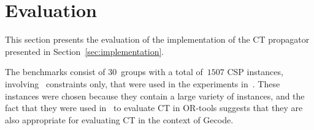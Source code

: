 \documentclass[a4paper,11pt]{article}
\newcommand{\Secref}[1]{Section~\ref{#1}}
\newcommand{\Chapref}[1]{Section~\ref{#1}}
\newcommand{\Table}{\Constraint{Table}}
\newcommand{\Supports}{\texttt{supports}}
\newcommand{\Residues}{\texttt{residues}}
\newcommand{\CTpaper}[0]{DBLP:conf/cp/DemeulenaereHLP16}
\numberwithin{equation}{section}
\begin{document}










\section{Evaluation}
\label{evaluation}

This section presents the evaluation of the implementation of the CT propagator
presented in \Chapref{sec:implementation}. 

\label{evaluation:setup}

The benchmarks consist of $30$~groups 
with a total of~$1507$ CSP instances, involving \Table~constraints only,
that were used in the
experiments in~\cite{\CTpaper}.
These instances were chosen because
they contain a large variety of instances,
and the fact that they were used in~\cite{\CTpaper}
to evaluate CT in OR-tools
suggests that they are also appropriate for evaluating CT
in the context of Gecode. 
\end{document}
